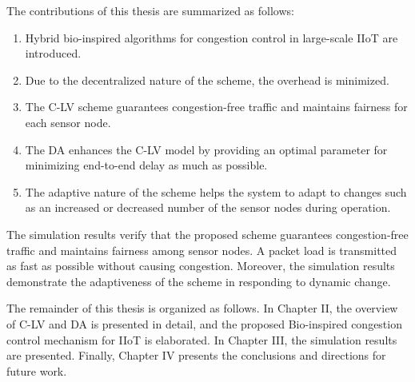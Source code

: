 The contributions of this thesis are summarized as follows:
\begin{enumerate}
	\item Hybrid bio-inspired algorithms for congestion control in large-scale IIoT are introduced.
	\item Due to the decentralized nature of the scheme, the overhead is minimized.
	\item The C-LV scheme guarantees congestion-free traffic and maintains fairness for each sensor node.
	\item The DA enhances the C-LV model by providing an optimal parameter for minimizing end-to-end delay as much as possible.
	\item The adaptive nature of the scheme helps the system to adapt to changes such as an increased or decreased number of the sensor nodes during operation.
\end{enumerate}

The simulation results verify that the proposed scheme guarantees congestion-free traffic and maintains fairness among sensor nodes.  A packet load is transmitted as fast as possible without causing congestion. Moreover, the simulation results demonstrate the adaptiveness of the scheme in responding to dynamic change.

The remainder of this thesis is organized as follows. In Chapter II, the overview of C-LV and DA is presented in detail, and the proposed Bio-inspired congestion control mechanism for IIoT is elaborated. In Chapter III, the simulation results are presented. Finally, Chapter IV presents the conclusions and directions for future work.